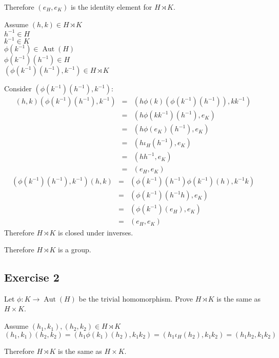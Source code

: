 \documentclass[letterpaper,12pt,fleqn]{article}
\DeclareMathOperator{\Aut}{Aut}
\newcommand{\p}{\phi}
\renewcommand{\i}{\iota}
\begin{document}
Therefore $(e_H,e_K)$ is the identity element for $H\rtimes K$.

Assume $(h,k)\in H\rtimes K$ \\
$h^{-1}\in H$ \\
$k^{-1}\in K$ \\
$\p(k^{-1})\in\Aut(H)$ \\
$\p(k^{-1})(h^{-1})\in H$ \\
$(\p(k^{-1})(h^{-1}),k^{-1})\in H\rtimes K$

Consider $(\p(k^{-1})(h^{-1}),k^{-1})$:
\begin{eqnarray*}
  (h,k)(\p(k^{-1})(h^{-1}),k^{-1}) &=&
  (h\p(k)(\p(k^{-1})(h^{-1})),kk^{-1}) \\
  &=& (h\p(kk^{-1})(h^{-1}),e_K) \\
  &=& (h\p(e_K)(h^{-1}),e_K) \\
  &=& (h\i_H(h^{-1}),e_K) \\
  &=& (hh^{-1},e_K) \\
  &=& (e_H,e_K)
\end{eqnarray*}
\begin{eqnarray*}
  (\p(k^{-1})(h^{-1}),k^{-1})(h,k) &=&
  (\p(k^{-1})(h^{-1})\p(k^{-1})(h),k^{-1}k) \\
  &=& (\p(k^{-1})(h^{-1}h),e_K) \\
  &=& (\p(k^{-1})(e_H),e_K) \\
  &=& (e_H,e_K)
\end{eqnarray*}
Therefore $H\rtimes K$ is closed under inverses.

Therefore $H\rtimes K$ is a group.

\subsection*{Exercise 2}

Let $\p:K\to\Aut(H)$ be the trivial homomorphism. Prove $H\rtimes K$ is the
same as $H\times K$.

Assume $(h_1,k_1),(h_2,k_2)\in H\rtimes K$ \\
$(h_1,k_1)(h_2,k_2)=(h_1\p(k_1)(h_2),k_1k_2)=(h_1\i_H(h_2),k_1k_2)=
(h_1h_2,k_1k_2)$

Therefore $H\rtimes K$ is the same as $H\times K$.
\end{document}
